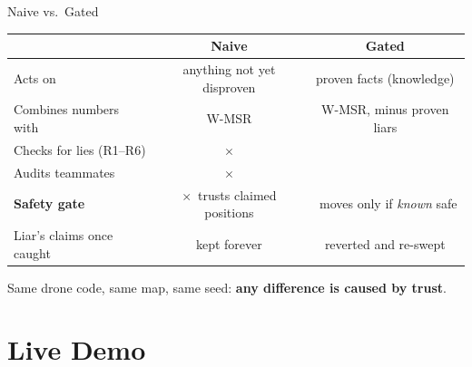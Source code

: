 \documentclass[aspectratio=169,10pt]{beamer}
\newcommand{\yes}{\textcolor{good}{\checkmark}}
\newcommand{\no}{\textcolor{bad}{$\times$}}
\begin{document}
\begin{frame}{Naive vs.\ Gated}
\centering
\renewcommand{\arraystretch}{1.45}
\begin{tabular}{l c c}
\toprule
 & \textbf{Naive} & \cellcolor{lightbg}\textbf{Gated} \\
\midrule
Acts on                    & anything not yet disproven  & \cellcolor{lightbg} proven facts (knowledge) \\
Combines numbers with      & W-MSR                       & \cellcolor{lightbg} W-MSR, minus proven liars \\
Checks for lies (R1--R6)   & \no                         & \cellcolor{lightbg} \yes \\
Audits teammates           & \no                         & \cellcolor{lightbg} \yes \\
\textbf{Safety gate}       & \no\ trusts claimed positions & \cellcolor{lightbg} \yes\ moves only if \emph{known} safe \\
Liar's claims once caught  & kept forever                & \cellcolor{lightbg} reverted and re-swept \\
\bottomrule
\end{tabular}

\vspace{1em}
Same drone code, same map, same seed: \textbf{any difference is caused by trust}.
\end{frame}

\section{Live Demo}
\end{document}
